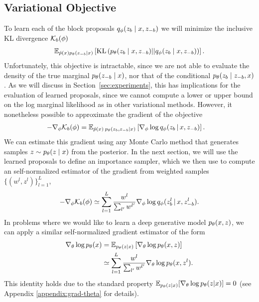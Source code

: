 \documentclass{article}
\theoremstyle{definition}
\begin{document}
\subsection{Variational Objective} 
To learn each of the block proposals $q_\phi(z_b \mid x, z_{-b})$ we will minimize the inclusive KL divergence $\mathcal{K}_b(\phi)$
\begin{align}
    \mathbb{E}_{\hat{p}(x)p_\theta(z_{-b} | x)}
    \left[
    \text{KL}\left(
        p_\theta(z_{b} \mid x, z_{-b})
        ||
        q_\phi(z_{b} \mid x, z_{-b})
    \right)
    \right]. \label{eq:variational_objective}
\end{align}
Unfortunately, this objective is intractable, since we are not able to evaluate the density of the true marginal $p_\theta(z_{-b} \mid x)$, nor that of the conditional $p_\theta(z_{b} \mid z_{-b}, x)$. 
As we will discuss in Section~\ref{sec:experiments}, this has implications for the evaluation of learned proposals, since we cannot compute a lower or upper bound on the log marginal likelihood as in other variational methods. However, it nonetheless possible to approximate the gradient of the objective 
\begin{align*}
    -\nabla_\phi \mathcal{K}_b(\phi)
    &=
    \mathbb{E}_{
    \hat{p}(x) \:
    p_\theta(z_{b}, z_{-b} | x)
    }
    \left[
    \nabla_\phi
    \log q_\phi(z_{b} \,|\, x, z_{-b})
    \right].
\end{align*}
We can estimate this gradient using any Monte Carlo method that generates samples $z \sim p_\theta(z \mid x)$ from the posterior. In the next section, we will use the learned proposals to define an importance sampler, which we then use to compute an self-normalized estimator of the gradient from weighted samples $\{(w^l, z^l)\}_{l=1}^L$, 
\begin{align}
    \label{eq:grad-self-normalized}
    -\nabla_\phi \mathcal{K}_b(\phi)
    \simeq
    \sum_{l=1}^L
    \frac{w^l}{\sum_{l'} w^{l'}}
    \nabla_\phi
    \log q_\phi(z^l_{b} \,|\, x, z^l_{-b})
    .
\end{align}
In problems where we would like to learn a deep generative model $p_\theta(x, z)$, we can apply a similar self-normalized gradient estimator of the form
\begin{align}
    \nabla_\theta \log p_\theta(x) 
    &=
    \mathbb{E}_{p_\theta(z | x)} 
    \left[
    \nabla_\theta \log p_\theta(x, z)
    \right] \label{eq:grad-theta}\\
    &
    \simeq
    \sum_{l=1}^L
    \frac{w^l}{\sum_{l'} w^{l'}}
    \nabla_\theta
    \log p_\theta(x, z^l)
    .\nonumber
\end{align}
This identity holds due to the standard property $\mathbb{E}_{p_\theta(z|x)}[\nabla_\theta \log p_\theta(z|x)]=0$ (see Appendix \ref{appendix:grad-theta} for details). 
\end{document}

